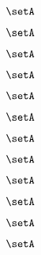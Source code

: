 \begin{forslides}
\begin{forslides}
    \begin{equation}
        \label{eq:slides-translation-99}
        \setA
    \end{equation}

    \begin{equation}
        \label{eq:slides-translation-100}
        \setA
    \end{equation}

    \begin{equation}
        \label{eq:slides-translation-111}
        \setA
    \end{equation}

    \begin{equation}
        \label{eq:slides-translation-112}
        \setA
    \end{equation}

    \begin{equation}
        \label{eq:slides-translation-113}
        \setA
    \end{equation}

    \begin{equation}
        \label{eq:slides-translation-114}
        \setA
    \end{equation}

    \begin{equation}
        \label{eq:slides-translation-115}
        \setA
    \end{equation}

    \begin{equation}
        \label{eq:slides-translation-116}
        \setA
    \end{equation}

    \begin{equation}
        \label{eq:slides-translation-117}
        \setA
    \end{equation}

    \begin{equation}
        \label{eq:slides-translation-118}
        \setA
    \end{equation}

    \begin{equation}
        \label{eq:slides-translation-119}
        \setA
    \end{equation}

    \begin{equation}
        \label{eq:slides-translation-120}
        \setA
    \end{equation}


\end{forslides}
\end{forslides}
